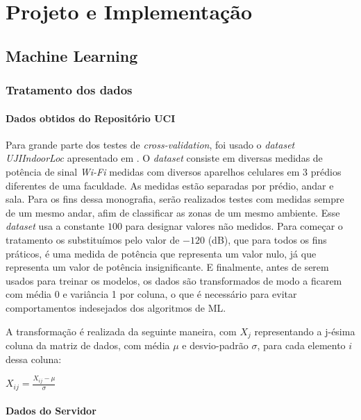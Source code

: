 \chapter{Projeto e Implementação}\label{chp:ml}

\section{Machine Learning}

\subsection{Tratamento dos dados}\label{sec:data1}

\subsubsection{Dados obtidos do Repositório UCI}
	Para grande parte dos testes de \textit{cross-validation}, foi usado o \textit{dataset}  \textit{UJIIndoorLoc} apresentado em \cite{uji}. O \textit{dataset} consiste em diversas medidas de potência de sinal \textit{Wi-Fi} medidas com diversos aparelhos celulares em 3 prédios diferentes de uma faculdade. As medidas estão separadas por prédio, andar e sala. Para os fins dessa monografia, serão realizados testes com medidas sempre de um mesmo andar, afim de classificar as zonas de um mesmo ambiente.  Esse  \textit{dataset} usa a constante $100$ para designar valores não medidos. Para começar o tratamento os substituímos pelo valor de $-120$ (dB), que para todos os fins práticos, é uma medida de potência que representa um valor nulo, já que representa um valor de potência insignificante. E finalmente, antes de serem usados para treinar os modelos, os dados são transformados de modo a ficarem com média 0 e variância 1 por coluna, o que é necessário para evitar comportamentos indesejados dos algoritmos de ML.

A transformação é realizada da seguinte maneira, com $X_j$ representando a j-ésima coluna da matriz de dados, com média $\mu$ e desvio-padrão $\sigma$, para cada elemento $i$ dessa coluna:

\begin{center}
$X_{ij}=\frac{X_{ij}-\mu}{\sigma}$
\end{center}

\subsubsection{Dados do Servidor}

